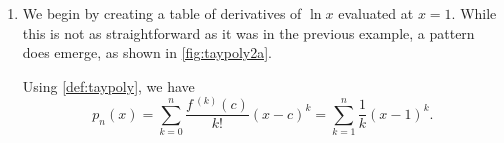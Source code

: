 {\begin{enumerate}
\item	We begin by creating a table of derivatives of $\ln x$ evaluated at $x=1$. While this is not as straightforward as it was in the previous example, a pattern does emerge, as shown in \autoref{fig:taypoly2a}.

Using \autoref{def:taypoly}, we have
\[
	p_n(x)
	= \sum_{k=0}^n\frac{f\,^{(k)}(c)}{k!}(x-c)^k
	= \sum_{k=1}^n\frac1k(x-1)^k.
\]


\end{enumerate}}
